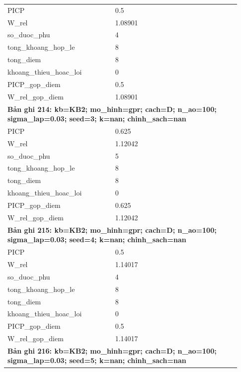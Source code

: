 \begin{longtable}{p{0.43\linewidth}p{0.50\linewidth}}
PICP & 0.5 \\
W\_\allowbreak rel & 1.08901 \\
so\_\allowbreak duoc\_\allowbreak phu & 4 \\
tong\_\allowbreak khoang\_\allowbreak hop\_\allowbreak le & 8 \\
tong\_\allowbreak diem & 8 \\
khoang\_\allowbreak thieu\_\allowbreak hoac\_\allowbreak loi & 0 \\
PICP\_\allowbreak gop\_\allowbreak diem & 0.5 \\
W\_\allowbreak rel\_\allowbreak gop\_\allowbreak diem & 1.08901 \\
\midrule
\multicolumn{2}{p{0.95\linewidth}}{\textbf{Bản ghi 214: kb=KB2; mo\_hinh=gpr; cach=D; n\_ao=100; sigma\_lap=0.03; seed=3; k=nan; chinh\_sach=nan}} \\
PICP & 0.625 \\
W\_\allowbreak rel & 1.12042 \\
so\_\allowbreak duoc\_\allowbreak phu & 5 \\
tong\_\allowbreak khoang\_\allowbreak hop\_\allowbreak le & 8 \\
tong\_\allowbreak diem & 8 \\
khoang\_\allowbreak thieu\_\allowbreak hoac\_\allowbreak loi & 0 \\
PICP\_\allowbreak gop\_\allowbreak diem & 0.625 \\
W\_\allowbreak rel\_\allowbreak gop\_\allowbreak diem & 1.12042 \\
\midrule
\multicolumn{2}{p{0.95\linewidth}}{\textbf{Bản ghi 215: kb=KB2; mo\_hinh=gpr; cach=D; n\_ao=100; sigma\_lap=0.03; seed=4; k=nan; chinh\_sach=nan}} \\
PICP & 0.5 \\
W\_\allowbreak rel & 1.14017 \\
so\_\allowbreak duoc\_\allowbreak phu & 4 \\
tong\_\allowbreak khoang\_\allowbreak hop\_\allowbreak le & 8 \\
tong\_\allowbreak diem & 8 \\
khoang\_\allowbreak thieu\_\allowbreak hoac\_\allowbreak loi & 0 \\
PICP\_\allowbreak gop\_\allowbreak diem & 0.5 \\
W\_\allowbreak rel\_\allowbreak gop\_\allowbreak diem & 1.14017 \\
\midrule
\multicolumn{2}{p{0.95\linewidth}}{\textbf{Bản ghi 216: kb=KB2; mo\_hinh=gpr; cach=D; n\_ao=100; sigma\_lap=0.03; seed=5; k=nan; chinh\_sach=nan}} \\

\end{longtable}

